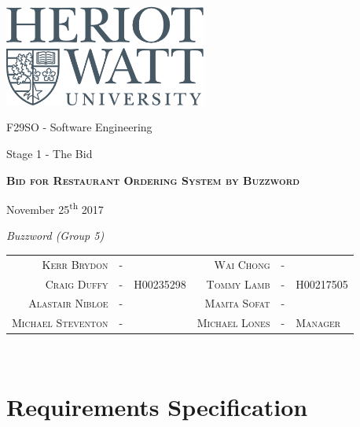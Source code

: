 \documentclass[11pt, a4paper]{report}
\begin{document}
\begin{titlepage}
	\thispagestyle{empty}
	{\centering
		\includegraphics[width=0.5\textwidth]{heriot-watt-logo.png}\par\vspace{1cm}
		\vspace{1cm}
		{\LARGE F29SO - Software Engineering\par}
		{\LARGE Stage 1 - The Bid\par}
		\vspace{1.5cm}
		\vspace{1.5cm}
		{\scshape\LARGE\bfseries Bid for Restaurant Ordering System by Buzzword \par}

		\vspace{3.5cm}
			\begin{center}
					November 25\textsuperscript{th} 2017
			\end{center}
		\vspace{1cm}
		\textit{Buzzword (Group 5)}\par
		\begin{tabulary}{\textwidth}{rcl|rcl}
			\\ \textsc{Kerr Brydon} & - & &
			\textsc{Wai Chong} & - & \\
			\textsc{Craig Duffy} & - & H00235298 &
			\textsc{Tommy Lamb} & - & H00217505 \\
			\textsc{Alastair Nibloe} & - & &
			\textsc{Mamta Sofat} & - & \\
			\textsc{Michael Steventon} & - & &
			\textsc{Michael Lones} & - & \textsc{Manager} \\
		\end{tabulary} \\
	
	}
\end{titlepage}

\dominitoc
\tableofcontents

\chapter{Requirements Specification}
\end{document}
